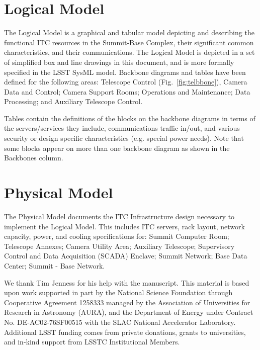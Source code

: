 \documentclass[11pt,twoside]{article}
\begin{document}
\section{Logical Model}


The Logical Model is a graphical and tabular model depicting and describing the functional ITC resources in the Summit-Base Complex, their significant common characteristics, and their communications.
The Logical Model is depicted in a set of simplified box and line drawings in this document, and is more formally specified in the LSST SysML model.
Backbone diagrams and tables have been defined for the following areas: Telescope Control (Fig.~\ref{fig:telbbone}), Camera Data and Control; Camera Support Rooms; Operations and Maintenance; Data Processing; and Auxiliary Telescope Control.

Tables contain the definitions of the blocks on the backbone diagrams in terms of the servers/services they include, communications traffic in/out, and various security or design specific characteristics (e.g. special power needs).
Note that some blocks appear on more than one backbone diagram as shown in the Backbones column.

\section{Physical Model}

The Physical Model documents the ITC Infrastructure design necessary to implement the Logical Model.
This includes ITC servers, rack layout, network capacity, power, and cooling specifications for: Summit Computer Room; Telescope Annexes; Camera Utility Area; Auxiliary Telescope; Supervisory Control and Data Acquisition (SCADA) Enclave; Summit Network; Base Data Center; Summit - Base Network.

\acknowledgements We thank Tim Jenness for his help with the manuscript. This material is based upon work supported in part by the National Science Foundation through Cooperative Agreement 1258333 managed by the Association of Universities for Research in Astronomy (AURA), and the Department of Energy under Contract No. DE-AC02-76SF00515 with the SLAC National Accelerator Laboratory. Additional LSST funding comes from private donations, grants to universities, and in-kind support from LSSTC Institutional Members.

\end{document}
